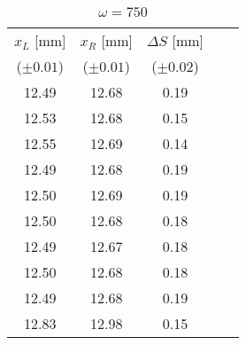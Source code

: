 \begin{table}[H]
    \centering
    \begin{tabular}{|c|c|c|c c|}
    \hline
    $x_L$ [mm]	&	$x_R$ [mm]	&	$\Delta S$ [mm]	\\
    ($\pm 0.01$)	&	 ($\pm 0.01$)	& ($\pm 0.02$)	\\
    \hline
        12.49	&	12.68	&	0.19	\\
        12.53	&	12.68	&	0.15	\\
        12.55	&	12.69	&	0.14	\\
        12.49	&	12.68	&	0.19	\\
        12.50	&	12.69	&	0.19	\\
        12.50	&	12.68	&	0.18	\\
        12.49	&	12.67	&	0.18	\\
        12.50	&	12.68	&	0.18	\\
        12.49	&	12.68	&	0.19	\\
        12.83	&	12.98	&	0.15	\\
    \hline
    \end{tabular}
    \caption{$\omega = 750$}
\end{table}